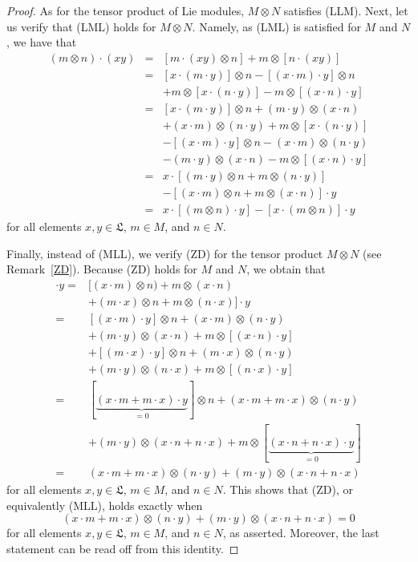 \documentclass{jonasart}
\newcommand{\lf}{\mathfrak{L}}
\begin{document}
	\begin{proof}
		As for the tensor product of Lie modules, $M\otimes N$ satisfies (LLM). Next, let us verify that (LML) holds for $M\otimes N$. Namely, as (LML)
		is satisfied for $M$ and $N$, we have that
		\begin{eqnarray*}
			(m\otimes n)\cdot(xy) & = & [m\cdot(xy)\otimes n]+m\otimes[n\cdot(xy)]\\
			& = & [x\cdot(m\cdot y)]\otimes n-[(x\cdot m)\cdot y]\otimes n\\
			&& +m\otimes[x\cdot(n\cdot y)]-m\otimes[(x\cdot n)\cdot y]\\
			& = & [x\cdot(m\cdot y)]\otimes n+(m\cdot y)\otimes(x\cdot n)\\
			&& +(x\cdot m)\otimes(n\cdot y)+m\otimes[x\cdot(n\cdot y)]\\
			&& -[(x\cdot m)\cdot y]\otimes n-(x\cdot m)\otimes(n\cdot y)\\
			&& -(m\cdot y)\otimes(x\cdot n)-m\otimes[(x\cdot n)\cdot y]\\
			& = & x\cdot[(m\cdot y)\otimes n+m\otimes(n\cdot y)]\\
			&& -[(x\cdot m)\otimes n+m\otimes(x\cdot n)]\cdot y\\
			& = & x\cdot[(m\otimes n)\cdot y]-[x\cdot(m\otimes n)]\cdot y
		\end{eqnarray*}
		for all elements $x,y\in\lf$, $m\in M$, and $n\in N$.

		Finally, instead of (MLL), we verify (ZD) for the tensor product
		$M\otimes N$ (see Remark~\ref{ZD}). Because (ZD) holds for $M$ and $N$, we obtain that
		\begin{align*}
			[x\cdot(m\otimes n)+(m\otimes n)\cdot x]
			\cdot y
            ={ }&{ } [(x\cdot m)\otimes n)
			+m\otimes(x\cdot n)\\
			& +(m\cdot x)\otimes n+m\otimes(n\cdot x)]\cdot y\\
			={ }&{ }[(x\cdot m)\cdot y]\otimes n+(x\cdot m)\otimes(n\cdot y)\\
			& +(m\cdot y)\otimes(x\cdot n)+m\otimes[(x\cdot n)\cdot y]\\
			& +[(m\cdot x)\cdot y]\otimes n+(m\cdot x)\otimes(n\cdot y)\\
			& +(m\cdot y)\otimes(n\cdot x)+m\otimes[(n\cdot x)\cdot y]\\
			={ }&{ }[\underbrace{(x\cdot m+m\cdot x)\cdot y}_{=0}]\otimes n
			+(x\cdot m+m\cdot x)\otimes(n\cdot y)\\
			& +(m\cdot y)\otimes(x\cdot n+n\cdot x)+m\otimes
			[\underbrace{(x\cdot n+n\cdot x)\cdot y}_{=0}]\\
			={ }&{ }(x\cdot m+m\cdot x)\otimes(n\cdot y)+(m\cdot y)\otimes(x\cdot n+n\cdot x)
		\end{align*}
		for all elements $x,y\in\lf$, $m\in M$, and $n\in N$. This shows that (ZD), or equivalently (MLL), holds exactly when
		\[
			(x\cdot m+m\cdot x)\otimes(n\cdot y)+(m\cdot y)\otimes(x\cdot n+n\cdot x)=0
		\]
		for all elements $x,y\in\lf$, $m\in M$, and $n\in N$, as asserted. Moreover, the last statement can be read off from this identity.
	\end{proof}
\end{document}
